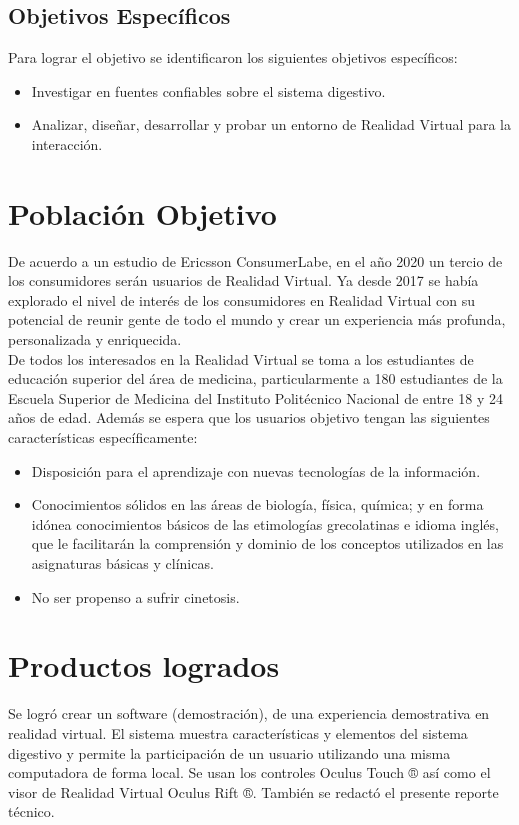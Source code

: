 \documentclass[11pt]{report}
\begin{document}
\subsection{Objetivos Específicos}
Para lograr el objetivo se identificaron los siguientes objetivos específicos:
\newline
\begin{itemize}
\item Investigar en fuentes confiables sobre el sistema digestivo.
\item Analizar, diseñar, desarrollar y probar un entorno de Realidad Virtual para la interacción.
\end{itemize}

\section{Población Objetivo}
De acuerdo a un estudio de Ericsson ConsumerLabe\cite{web3}, en el año 2020 un tercio de los consumidores serán usuarios de Realidad Virtual. Ya desde 2017 se había explorado el nivel de interés de los consumidores en Realidad Virtual\cite{web4} con su potencial de reunir gente de todo el mundo y crear un experiencia más profunda, personalizada y enriquecida.\\
\newline
De todos los interesados en la Realidad Virtual se toma a los estudiantes de educación superior del área de medicina, particularmente a 180\cite{ofi1}  estudiantes de la Escuela Superior de Medicina del Instituto Politécnico Nacional de entre 18 y 24 años de edad. Además se espera que los usuarios objetivo tengan las siguientes características\cite{web5} específicamente:\\
\newline
\begin{itemize}
\item Disposición para el aprendizaje con nuevas tecnologías de la información.
\item Conocimientos sólidos en las áreas de biología, física, química; y en forma idónea conocimientos básicos de las etimologías grecolatinas e idioma inglés, que le facilitarán la comprensión y dominio de los conceptos utilizados en las asignaturas básicas y clínicas.
\item No ser propenso a sufrir cinetosis.
\end{itemize}

\section{Productos logrados}
Se logró crear un software (demostración), de una experiencia demostrativa en realidad virtual. El sistema muestra características y elementos del sistema digestivo y permite la participación de un usuario utilizando una misma computadora de forma local. Se usan los controles Oculus Touch ® así como el visor de Realidad Virtual Oculus Rift ®. También se redactó el presente reporte técnico.
\end{document}
